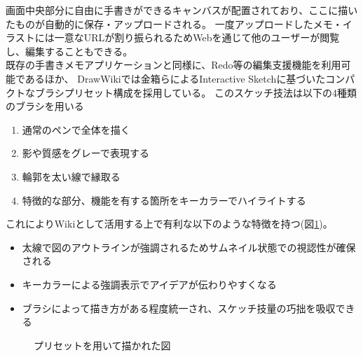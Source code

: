画面中央部分に自由に手書きができるキャンバスが配置されており、ここに描いたものが自動的に保存・アップロードされる。
一度アップロードしたメモ・イラストには一意なURLが割り振られるためWebを通じて他のユーザーが閲覧し、編集することもできる。
\\
既存の手書きメモアプリケーションと同様に、Redo等の編集支援機能を利用可能であるほか、
DrawWikiでは金箱らによるInteractive Sketch\cite{130004638060}に基づいたコンパクトなブラシプリセット構成を採用している。
このスケッチ技法は以下の4種類のブラシを用いる
\begin{enumerate}
    \item 通常のペンで全体を描く
    \item 影や質感をグレーで表現する
    \item 輪郭を太い線で縁取る
    \item 特徴的な部分、機能を有する箇所をキーカラーでハイライトする
\end{enumerate}
これによりWikiとして活用する上で有利な以下のような特徴を持つ(図\ref{fig:interactivesketch})。
\begin{itemize}
    \item 太線で図のアウトラインが強調されるためサムネイル状態での視認性が確保される
    \item キーカラーによる強調表示でアイデアが伝わりやすくなる
    \item ブラシによって描き方がある程度統一され、スケッチ技量の巧拙を吸収できる
\end{itemize}

\begin{figure}[htbp]
    \begin{center}
         \end{center}
    \caption{プリセットを用いて描かれた図}
    \label{fig:interactivesketch}
\end{figure}

